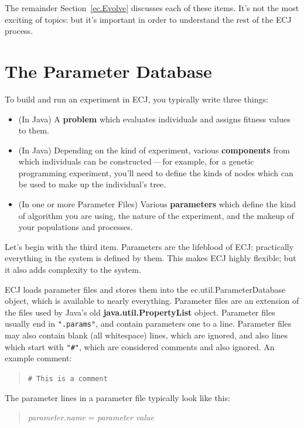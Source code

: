 \documentclass[twoside,10pt]{book}
\newcommand\class[1]{\index{#1}\textsf{#1}}
\newcommand\character[1]{\texttt{"{#1}"}}
\newcommand\textstr[1]{\texttt{"{#1}"}}
\begin{document}
The remainder Section~\ref{ec.Evolve} discusses each of these items.  It's not the most exciting of topics: but it's important in order to understand the rest of the ECJ process.

\section{The Parameter Database}
\label{parameterdatabase}

To build and run an experiment in ECJ, you typically write three things:

\begin{itemize}
\item (In Java) A {\bf problem} which evaluates individuals and assigns fitness values to them.
\item (In Java) Depending on the kind of experiment, various {\bf components} from which individuals can be constructed\,---\,for example, for a genetic programming experiment, you'll need to define the kinds of nodes which can be used to make up the individual's tree.
\item (In one or more Parameter Files) Various {\bf parameters} which define the kind of algorithm you are using, the nature of the experiment, and the makeup of your populations and processes.
\end{itemize}

Let's begin with the third item.  Parameters are the lifeblood of ECJ: practically everything in the system is defined by them.  This makes ECJ highly flexible; but it also adds complexity to the system.

ECJ loads parameter files and stores them into the \class{ec.util.ParameterDatabase} object, which is available to nearly everything.  Parameter files are an extension of the files used by Java's old {\bf java.util.PropertyList} object.  Parameter files usually end in \textstr{.params}, and contain parameters one to a line.  Parameter files may also contain blank (all whitespace) lines, which are ignored, and also lines which start with \character{\#}, which are considered comments and also ignored.  An example comment:
\begin{quote}
\texttt{\# This is a comment}
\end{quote}

The parameter lines in a parameter file typically look like this:
\begin{quote}
{\it parameter.name} = {\it parameter value}
\end{quote}
\end{document}
